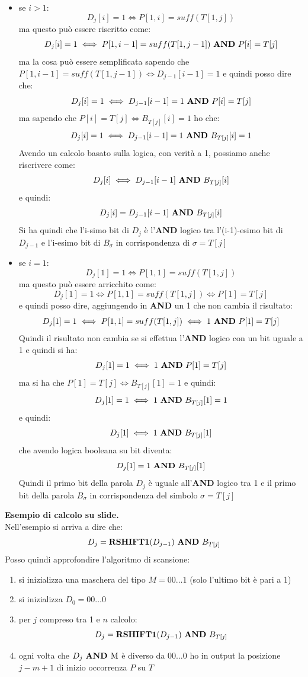 \documentclass[a4paper,12pt, oneside]{book}
\begin{document}
\begin{itemize}
  \item se $i>1$:
  \[D_j[i]=1\iff P[1,i]=suff(T[1,j])\]
  ma questo può essere riscritto come:
  \[D_j[i]=1\iff P[1,i-1]=suff(T[1,j-1])\mbox{ \textbf{AND} }P[i]=T[j]\]
  ma la cosa può essere semplificata sapendo che $P[1,i-1]=suff(T[1,j-1])\iff
  D_{j-1}[i-1]=1$ e quindi posso dire che:
  \[D_j[i]=1\iff  D_{j-1}[i-1]=1\mbox{ \textbf{AND} }P[i]=T[j]\]
  ma sapendo che $P[i]=T[j]\iff B_{T[j]}[i]=1$ ho che:
  \[D_j[i]=1\iff  D_{j-1}[i-1]=1\mbox{ \textbf{AND} }B_{T[j]}[i]=1\]
  Avendo un calcolo basato sulla logica, con verità a 1, possiamo anche
  riscrivere come:
  \[D_j[i]\iff  D_{j-1}[i-1]\mbox{ \textbf{AND} }B_{T[j]}[i]\]
  e quindi:
  \[D_j[i]=  D_{j-1}[i-1]\mbox{ \textbf{AND} }B_{T[j]}[i]\]
  Si ha quindi che l'i-simo bit di $D_j$ è l'\textbf{AND} logico tra
  l'(i-1)-esimo bit di $D_{j-1}$ e l'i-esimo bit di $B_\sigma$ in corrispondenza
  di $\sigma=T[j]$
  
  \item se $i=1$:
  \[D_j[1]=1\iff P[1,1]=suff(T[1,j])\]
  ma questo può essere arricchito come:
  \[D_j[1]=1\iff P[1,1]= suff(T[1,j])\iff P[1]=T[j]\]
  e quindi posso dire, aggiungendo in \textbf{AND} un 1 che non cambia il
  risultato: 
  \[D_j[1]=1\iff P[1,1]= suff(T[1,j])\iff 1\mbox{ \textbf{AND} }P[1]=T[j]\]
  Quindi il risultato non cambia se si effettua l'\textbf{AND} logico con un bit
  uguale a 1 e quindi si ha:
  \[D_j[1]=1\iff 1\mbox{ \textbf{AND} }P[1]=T[j]\]
  ma si ha che $P[1]=T[j]\iff B_{T[j]}[1]=1$ e quindi:
  \[D_j[1]=1\iff 1\mbox{ \textbf{AND} }B_{T[j]}[1]=1\]
  e quindi:
  \[D_j[1]\iff 1\mbox{ \textbf{AND} }B_{T[j]}[1]\]
  che avendo logica booleana su bit diventa:
  \[D_j[1]= 1\mbox{ \textbf{AND} }B_{T[j]}[1]\]
  Quindi il primo bit della parola $D_j$ è uguale all'\textbf{AND} logico tra 1
  e il primo bit della parola $B_\sigma$ in corrispondenza del simbolo
  $\sigma=T[j]$  
\end{itemize}
\textbf{Esempio di calcolo su slide.}\\
Nell'esempio si arriva a dire che:
\[D_j=\mathbf{RSHIFT1}(D_{j-1})\mbox{ \textbf{AND} }B_{T[j]}\]
Posso quindi approfondire l'algoritmo di scansione:
\begin{enumerate}
  \item si inizializza una maschera del tipo $M=00\ldots 1$ (solo l'ultimo bit è
  pari a 1)
  \item si inizializza $D_0=00\ldots 0$
  \item per $j$ compreso tra 1 e $n$ calcolo:
  \[D_j=\mathbf{RSHIFT1}(D_{j-1})\mbox{ \textbf{AND} }B_{T[j]}\]
  \item ogni volta che $D_j\mbox{ \textbf{AND }M}$ è diverso da $00\ldots0$ ho
  in output la posizione $j-m+1$ di inizio occorrenza $P$ su $T$
\end{enumerate}
\end{document}
